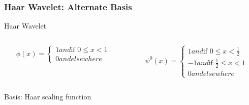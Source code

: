     \begin{frame}
    \frametitle{Haar Wavelet: Alternate Basis}

        \vspace{-0.5cm}
        Haar Wavelet
        \vspace{-0.5cm}

          \begin{columns}[T]
            \begin{column}{.5\textwidth}

                \begin{equation}\label{eq:qlmwphi0}
                \phi(x)=
                \left\{
                    \begin{array}{ll}
                        1  and \mbox{if } 0 \leq x < 1 \\
                        0 and elsewhere
                    \end{array}
                \right.
                \nonumber
                \end{equation}

        \end{column}
        \begin{column}{.5\textwidth}

              \begin{equation}
              \psi^0(x)=
              \left\{
                  \begin{array}{ll}
                      1 and \mbox{if } 0 \leq x < \frac{1}{2} \\
                      -1  and \mbox{if } \frac{1}{2} \leq x < 1 \\
                      0 and elsewhere
                  \end{array}
              \right.
              \nonumber
              \end{equation}

        \end{column}
      \end{columns}

        \vspace{0.5cm}

          \begin{columns}[T]
            \begin{column}{.5\textwidth}
                
                 Basis: Haar scaling function 
        \vspace{0.5cm}


\end{column}
\end{columns}
\end{frame}
